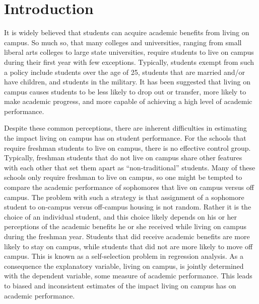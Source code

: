 \documentclass[12pt]{article}
\begin{document}
\section{Introduction}
It is widely believed that students can acquire academic benefits from living on campus.  So much so, that many colleges and universities, ranging from small liberal arts colleges to large state universities, require students to live on campus during their first year with few exceptions.  Typically, students exempt from such a policy include students over the age of 25, students that are married and/or have children, and students in the military.  It has been suggested that living on campus causes students to be less likely to drop out or transfer, more likely to make academic progress, and more capable of achieving a high level of academic performance.

Despite these common perceptions, there are inherent difficulties in estimating the impact living on campus has on student performance.  For the schools that require freshman students to live on campus, there is no effective control group.  Typically, freshman students that do not live on campus share other features with each other that set them apart as ``non-traditional'' students.  Many of these schools only require freshman to live on campus, so one might be tempted to compare the academic performance of sophomores that live on campus versus off campus.  The problem with such a strategy is that assignment of a sophomore student to on-campus versus off-campus housing is not random.  Rather it is the choice of an individual student, and this choice likely depends on his or her perceptions of the academic benefits he or she received while living on campus during the freshman year.  Students that did receive academic benefits are more likely to stay on campus, while students that did not are more likely to move off campus.  This is known as a self-selection problem in regression analysis.  As a consequence the explanatory variable, living on campus, is jointly determined with the dependent variable, some measure of academic performance.  This leads to biased and inconsistent estimates of the impact living on campus has on academic performance.
\end{document}
